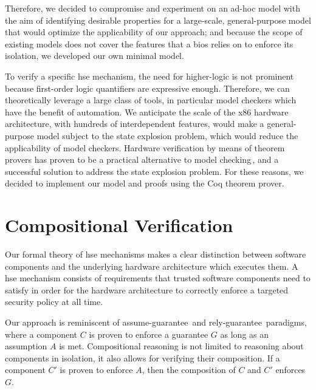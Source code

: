 Therefore, we decided to compromise and experiment on an ad-hoc model with the
aim of identifying desirable properties for a large-scale, general-purpose model
that would optimize the applicability of our approach; and because the scope of
existing models does not cover the features that a \ac{bios} relies on to
enforce its isolation, we developed our own minimal model.
%
%

To verify a specific \ac{hse} mechanism, the need for higher-logic is not
prominent because first-order logic quantifiers are expressive enough.
%
Therefore, we can theoretically leverage a large class of tools, in particular
model checkers which have the benefit of automation.
%
We anticipate the scale of the x86 hardware architecture, with hundreds of
interdependent features, would make a general-purpose model subject to the state
explosion problem, which would reduce the applicability of model checkers.
%
Hardware verification by means of theorem provers has proven to be a practical
alternative to model checking\,\cite{vijayaraghavan2015modular,choi2017kami},
and a successful solution to address the state explosion problem.
%
For these reasons, we decided to implement our model and proofs using the Coq
theorem prover.

\section{Compositional Verification}
\label{section:sota:compsec}


Our formal theory of \ac{hse} mechanisms makes a clear distinction between
software components and the underlying hardware architecture which executes
them.
%
A \ac{hse} mechanism consists of requirements that trusted software components
need to satisfy in order for the hardware architecture to correctly enforce a
targeted security policy at all time.

Our approach is reminiscent of assume-guarantee\,\cite{pnueli1985ag} and
rely-guarantee\,\cite{jones1983tentative} paradigms, where a component \( C \)
is proven to enforce a guarantee \( G \) as long as an assumption \( A \) is
met. 
%
Compositional reasoning  is not limited to reasoning about components in
isolation, it also allows for verifying their composition.
%
If a component \( C' \) is proven to enforce \( A \), then the composition of
\( C \) and \( C' \) enforces \( G \).


